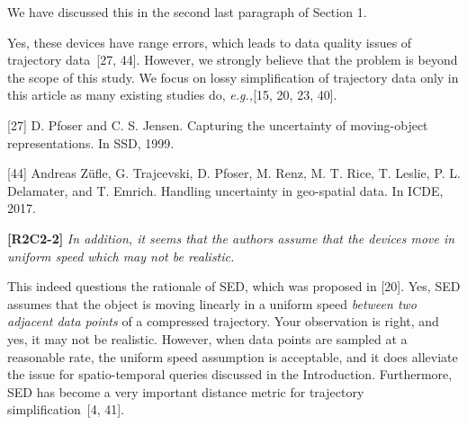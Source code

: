 \documentclass{letter}
\newcommand{\eg}{\emph{e.g.,}\xspace}
\begin{document}
We have discussed this in the second last paragraph of Section 1.

Yes, these devices have range errors, which leads to data quality issues of trajectory data~[27, 44]. However, we strongly believe that the problem is beyond the scope of this study. We focus on lossy simplification of trajectory data only in this article as many existing studies do, \eg [15, 20, 23, 40].

[27] D. Pfoser and C. S. Jensen. Capturing the uncertainty of moving-object representations. In SSD, 1999.

[44] Andreas Z{\"{u}}fle, G. Trajcevski, D. Pfoser, M. Renz, M. T. Rice, T. Leslie, P. L. Delamater, and T. Emrich.
Handling uncertainty in geo-spatial data. In ICDE, 2017.

%




\textbf{[R2C2-2]} \emph{In addition, it seems that the authors assume that the devices move in uniform speed which may not be realistic.}

This indeed questions the rationale of SED, which was proposed in [20]. Yes, SED assumes that the object is moving linearly in a uniform speed \textit{between two adjacent data points} of a compressed trajectory. Your observation is right, and yes, it may not be realistic. However, when data points are sampled at a reasonable rate, the uniform speed assumption is acceptable, and it does alleviate the issue for spatio-temporal queries discussed in the Introduction. Furthermore, SED has become a very important distance metric for trajectory simplification~[4, 41].
\end{document}
